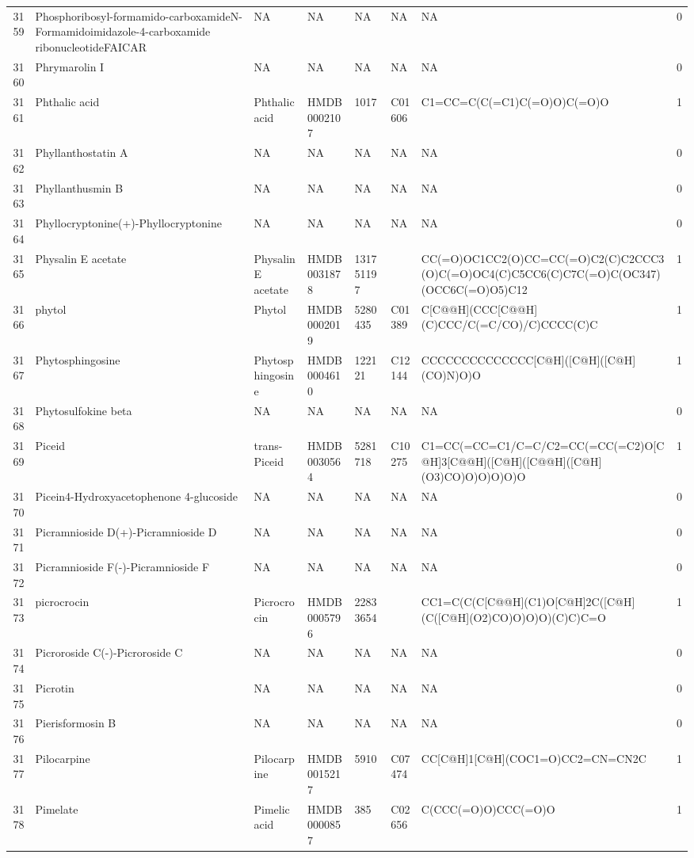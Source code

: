 \documentclass[a4paper]{article}
\begin{document}
\begin{longtable}{rlllllll}
  3159 & Phosphoribosyl-formamido-carboxamideN-Formamidoimidazole-4-carboxamide ribonucleotideFAICAR & NA & NA & NA & NA & NA & 0 \\ 
  3160 & Phrymarolin I & NA & NA & NA & NA & NA & 0 \\ 
  3161 & Phthalic acid & Phthalic acid & HMDB0002107 & 1017 & C01606 & C1=CC=C(C(=C1)C(=O)O)C(=O)O & 1 \\ 
  3162 & Phyllanthostatin A & NA & NA & NA & NA & NA & 0 \\ 
  3163 & Phyllanthusmin B & NA & NA & NA & NA & NA & 0 \\ 
  3164 & Phyllocryptonine(+)-Phyllocryptonine & NA & NA & NA & NA & NA & 0 \\ 
  3165 & Physalin E acetate & Physalin E acetate & HMDB0031878 & 131751197 &  & CC(=O)OC1CC2(O)CC=CC(=O)C2(C)C2CCC3(O)C(=O)OC4(C)C5CC6(C)C7C(=O)C(OC347)(OCC6C(=O)O5)C12 & 1 \\ 
  3166 & phytol & Phytol & HMDB0002019 & 5280435 & C01389 & C[C@@H](CCC[C@@H](C)CCC/C(=C/CO)/C)CCCC(C)C & 1 \\ 
  3167 & Phytosphingosine & Phytosphingosine & HMDB0004610 & 122121 & C12144 & CCCCCCCCCCCCCC[C@H]([C@H]([C@H](CO)N)O)O & 1 \\ 
  3168 & Phytosulfokine beta & NA & NA & NA & NA & NA & 0 \\ 
  3169 & Piceid & trans-Piceid & HMDB0030564 & 5281718 & C10275 & C1=CC(=CC=C1/C=C/C2=CC(=CC(=C2)O[C@H]3[C@@H]([C@H]([C@@H]([C@H](O3)CO)O)O)O)O)O & 1 \\ 
  3170 & Picein4-Hydroxyacetophenone 4-glucoside & NA & NA & NA & NA & NA & 0 \\ 
  3171 & Picramnioside D(+)-Picramnioside D & NA & NA & NA & NA & NA & 0 \\ 
  3172 & Picramnioside F(-)-Picramnioside F & NA & NA & NA & NA & NA & 0 \\ 
  3173 & picrocrocin & Picrocrocin & HMDB0005796 & 22833654 &  & CC1=C(C(C[C@@H](C1)O[C@H]2C([C@H](C([C@H](O2)CO)O)O)O)(C)C)C=O & 1 \\ 
  3174 & Picroroside C(-)-Picroroside C & NA & NA & NA & NA & NA & 0 \\ 
  3175 & Picrotin & NA & NA & NA & NA & NA & 0 \\ 
  3176 & Pierisformosin B & NA & NA & NA & NA & NA & 0 \\ 
  3177 & Pilocarpine & Pilocarpine & HMDB0015217 & 5910 & C07474 & CC[C@H]1[C@H](COC1=O)CC2=CN=CN2C & 1 \\ 
  3178 & Pimelate & Pimelic acid & HMDB0000857 & 385 & C02656 & C(CCC(=O)O)CCC(=O)O & 1 \\ 

\end{longtable}
\end{document}
